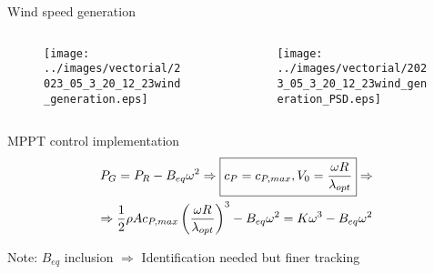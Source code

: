 \begin{frame}{Wind speed generation}
  \begin{columns}
    \begin{column}{0.5\columnwidth}
      \begin{figure}[htb]
        \centering
        \texttt{[image: ../images/vectorial/2023\_05\_3\_20\_12\_23wind\_generation.eps]}
        \label{fig:wind_generation}
    \end{figure}
    \end{column}
  
    \begin{column}{0.5\columnwidth}
      \begin{figure}[htb]
          \centering
          \texttt{[image: ../images/vectorial/2023\_05\_3\_20\_12\_23wind\_generation\_PSD.eps]}
          \label{fig:wind_generation_PSD}
      \end{figure}
    \end{column}
  \end{columns}
\end{frame}

\begin{frame}{MPPT control implementation}
  \begin{gather}
    P_G = P_R - B_{eq} \omega^2 \Rightarrow \boxed{c_P = c_{P,max}, V_0=\frac{\omega R}{\lambda_{opt}}} \Rightarrow \notag\\
    \Rightarrow \frac{1}{2}\rho A c_{P,max} \left(\frac{\omega R}{\lambda_{opt}}\right)^3 - B_{eq} \omega^2=K\omega^3 - B_{eq} \omega^2
    \notag
  \end{gather}

  \begin{figure}
      \centering
      \begingroup
        
      \endgroup
  \end{figure}
  Note: $B_{eq}$ inclusion $\Rightarrow$ Identification needed but finer tracking
\end{frame}

